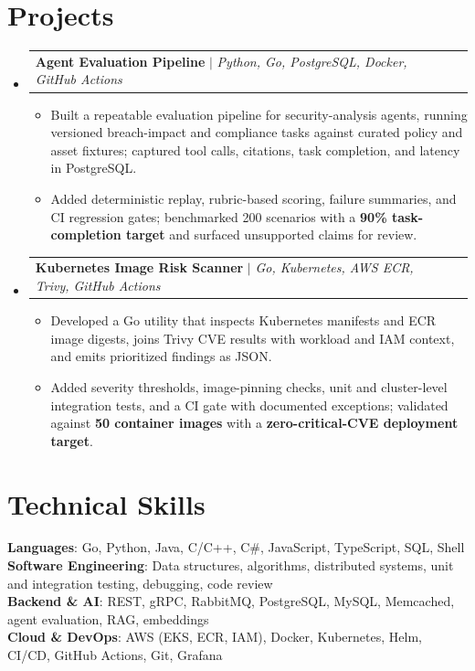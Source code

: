 \documentclass[letterpaper,11pt]{article}
\makeatletter
\newcommand{\resumeItem}[1]{
  \item\small{
    {#1 \vspace{-2pt}}
  }
}
\newcommand{\resumeProjectHeading}[2]{
    \item
    \begin{tabular*}{0.97\textwidth}{l@{\extracolsep{\fill}}r}
      \small#1 & #2 \\
    \end{tabular*}\vspace{-7pt}
}
\newcommand{\resumeSubHeadingListStart}{\begin{itemize}[leftmargin=0.15in, label={}]}
\newcommand{\resumeSubHeadingListEnd}{\end{itemize}}
\newcommand{\resumeItemListStart}{\begin{itemize}}
\newcommand{\resumeItemListEnd}{\end{itemize}\vspace{-5pt}}
\makeatother
\begin{document}
\section{Projects}
\resumeSubHeadingListStart
\resumeProjectHeading
{\textbf{Agent Evaluation Pipeline} $|$ \emph{Python, Go, PostgreSQL, Docker, GitHub Actions}}{}
\resumeItemListStart
\resumeItem{Built a repeatable evaluation pipeline for security-analysis agents, running versioned breach-impact and compliance tasks against curated policy and asset fixtures; captured tool calls, citations, task completion, and latency in PostgreSQL.}
\resumeItem{Added deterministic replay, rubric-based scoring, failure summaries, and CI regression gates; benchmarked 200 scenarios with a \textbf{90\% task-completion target} and surfaced unsupported claims for review.}
\resumeItemListEnd
\resumeProjectHeading
{\textbf{Kubernetes Image Risk Scanner} $|$ \emph{Go, Kubernetes, AWS ECR, Trivy, GitHub Actions}}{}
\resumeItemListStart
\resumeItem{Developed a Go utility that inspects Kubernetes manifests and ECR image digests, joins Trivy CVE results with workload and IAM context, and emits prioritized findings as JSON.}
\resumeItem{Added severity thresholds, image-pinning checks, unit and cluster-level integration tests, and a CI gate with documented exceptions; validated against \textbf{50 container images} with a \textbf{zero-critical-CVE deployment target}.}
\resumeItemListEnd
\resumeSubHeadingListEnd


\section{Technical Skills}
\begin{itemize}[leftmargin=0.15in, label={}]
  \small{\item{
        \textbf{Languages}{: Go, Python, Java, C/C++, C\#, JavaScript, TypeScript, SQL, Shell} \\
        \textbf{Software Engineering}{: Data structures, algorithms, distributed systems, unit and integration testing, debugging, code review} \\
        \textbf{Backend \& AI}{: REST, gRPC, RabbitMQ, PostgreSQL, MySQL, Memcached, agent evaluation, RAG, embeddings} \\
        \textbf{Cloud \& DevOps}{: AWS (EKS, ECR, IAM), Docker, Kubernetes, Helm, CI/CD, GitHub Actions, Git, Grafana}
        }}
\end{itemize}


\end{document}
